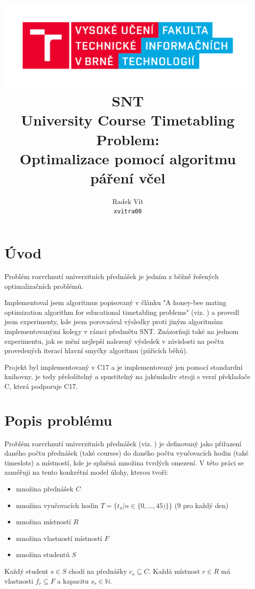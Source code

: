 \documentclass[12pt, a4paper]{article}
\author{Radek Vít\\ \texttt{xvitra00}}
\title{
	\includegraphics[scale=0.6]{FIT_barevne_PANTONE_CZ.pdf}\\
	SNT\\
	University Course Timetabling Problem:\\ Optimalizace pomocí algoritmu páření včel
}
\def\CC{{C\nolinebreak[4]\hspace{-.05em}\raisebox{.4ex}{\tiny\bf ++}}}
\begin{document}
\newpage
\maketitle

\section{Úvod}
Problém rozvrhnutí univerzitních přednášek je jedním z běžně řešených optimalizačních problémů.

Implementoval jsem algoritmus popisovaný v článku "A honey-bee mating optimization algorithm for educational timetabling problems"
(viz. \cite{HoneyBee}) a provedl jsem experimenty, kde jsem porovnával výsledky proti jiným algoritmům implementovanými
kolegy v rámci předmětu SNT. Znázorňuji také na jednom experimentu, jak se mění nejlepší nalezený výsledek v závislosti na počtu provedených iterací hlavní smyčky algoritmu (pářicích běhů).

Projekt byl implementovaný v \CC{}17 a je implementovaný jen pomocí standardní knihovny, je tedy přeložitelný a spustitelný na jakémkoliv stroji s verzí překladače \CC{}, která podporuje \CC{}17.
\section{Popis problému}
Problém rozvrhnutí univerzitních přednášek (viz. \cite{HoneyBee}) je definovaný jako 
při\-řa\-ze\-ní daného počtu přednášek (také courses) do daného počtu vyučovacích hodin (také timeslots) a místností,
kde je splněná množina tvrdých omezení. %
V této práci se zaměřuji na tento konkrétní model úlohy, kterou tvoří:
\begin{itemize}
  \item množina přednášek $C$
  \item množina vyučovacích hodin $T = \{t_n | n \in \{0, \dots, 45)\}\}$ (9 pro každý den)
  \item množina místností $R$
  \item množina vlastností místností $F$
  \item množina studentů $S$
\end{itemize}
Každý student $s \in S$ chodí na přednášky $c_s \subseteq C$. Každá místnost $r \in R$ má vlastnosti $f_r \subseteq F$ a kapacitu $s_r \in \mathbb{N}$.
\end{document}
